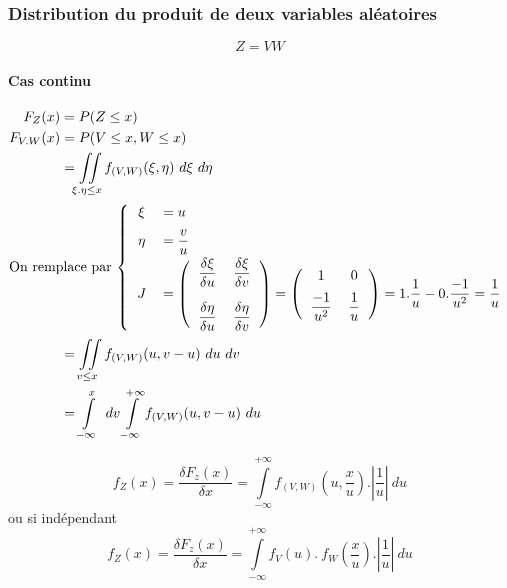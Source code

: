 \newpage
\subsubsection{Distribution du produit de deux variables aléatoires}
$$\boxed{Z = VW}$$

\paragraph{Cas continu}
\begin{align*}
	F_Z(x)     &= P(Z \leq x)\\
	F_{V.W}(x) &= P(V \leq x, W \leq x) \\
	           &= \iint\limits_{\xi . \eta\leq x} f_{(V,W)}(\xi,\eta)\ d\xi\ d\eta\\
	\intertext{On remplace par $\left\{
		\begin{tabular}{cl}
			$\xi$  & $= u$\\[0.2cm]
			$\eta$ & $= \dfrac{v}{u}$\\[0.2cm]
			$J$    & $= \left(\begin{tabular}{cc}$\dfrac{\delta\xi}{\delta u}$&$\dfrac{\delta \xi}{\delta v}$\\[0.5cm]$\dfrac{\delta\eta}{\delta u}$&$\dfrac{\delta\eta}{\delta v}$\end{tabular}\right) = \left(\begin{tabular}{cc}1&0\\[0.2cm]$\dfrac{-1}{u^2}$&$\dfrac{1}{u}$\end{tabular}\right) = 1.\dfrac{1}{u} - 0.\dfrac{-1}{u^2} = \dfrac{1}{u}$
		\end{tabular}
		\right.$}
	&= \iint\limits_{v\leq x} f_{(V,W)}(u,v-u)\ du\ dv\\
	&= \int\limits_{-\infty}^x\ dv \int\limits_{-\infty}^{+\infty} f_{(V,W)}(u,v-u)\ du
\end{align*}

$$\boxed{f_Z(x) = \frac{\delta F_z(x)}{\delta x} = \int\limits_{-\infty}^{+\infty} f_{(V,W)}\left(u,\dfrac{x}{u}\right).\left|\dfrac{1}{u}\right|\ du }$$
ou si indépendant
$$\boxed{f_Z(x) = \frac{\delta F_z(x)}{\delta x} = \int\limits_{-\infty}^{+\infty} f_V\left(u\right).\ f_W\left(\dfrac{x}{u}\right).\left|\dfrac{1}{u}\right|\ du }$$